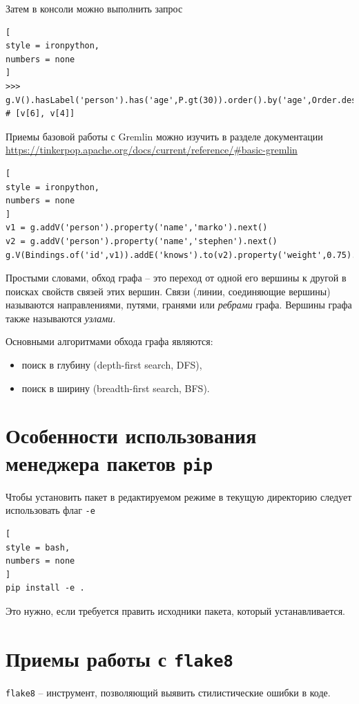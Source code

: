 \documentclass[%
	11pt,
	a4paper,
	utf8,
		]{article}
\begin{document}
Затем в консоли можно выполнить запрос
\begin{lstlisting}[
style = ironpython,
numbers = none
]
>>> g.V().hasLabel('person').has('age',P.gt(30)).order().by('age',Order.desc).toList()  # [v[6], v[4]]
\end{lstlisting}

Приемы базовой работы с Gremlin можно изучить в разделе документации \url{https://tinkerpop.apache.org/docs/current/reference/#basic-gremlin}
\begin{lstlisting}[
style = ironpython,
numbers = none
]
v1 = g.addV('person').property('name','marko').next()
v2 = g.addV('person').property('name','stephen').next()
g.V(Bindings.of('id',v1)).addE('knows').to(v2).property('weight',0.75).iterate()
\end{lstlisting}

Простыми словами, обход графа -- это переход от одной его вершины к другой в поисках свойств связей этих вершин. Связи (линии, соединяющие вершины) называются направлениями, путями, гранями или \emph{ребрами} графа. Вершины графа также называются \emph{узлами}.

Основными алгоритмами обхода графа являются:
\begin{itemize}
	\item поиск в глубину (depth-first search, DFS),
	
	\item поиск в ширину (breadth-first search, BFS).
\end{itemize}



\section{Особенности использования менеджера пакетов \texttt{pip}}

Чтобы установить пакет в редактируемом режиме в текущую директорию следует использовать флаг \verb*|-e|
\begin{lstlisting}[
style = bash,
numbers = none
]
pip install -e .
\end{lstlisting}

Это нужно, если требуется править исходники пакета, который устанавливается.


\section{Приемы работы с \texttt{flake8}}

\texttt{flake8} -- инструмент, позволяющий выявить стилистические ошибки в коде.
\end{document}
